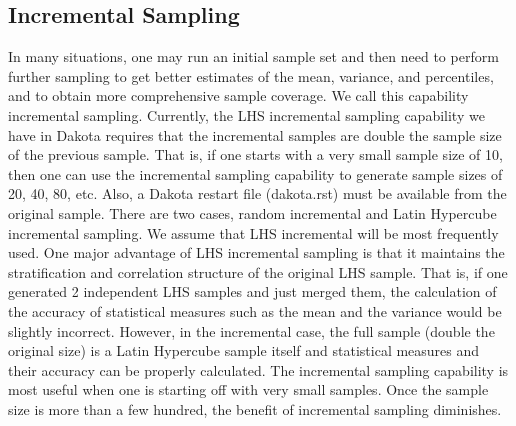 \subsection{Incremental Sampling}\label{uq:incremental}

In many situations, one may run an initial sample set and then need to
perform further sampling to get better estimates of the mean,
variance, and percentiles, and to obtain more comprehensive sample
coverage. We call this capability incremental sampling. Currently,
the LHS incremental sampling capability we have in Dakota requires that
the incremental samples are double the sample size of the previous
sample. That is, if one starts with a very small sample size of 10,
then one can use the incremental sampling capability to generate
sample sizes of 20, 40, 80, etc. Also, a Dakota restart file
(dakota.rst) must be available from the original sample. There are two
cases, random incremental and Latin Hypercube incremental sampling.
We assume that LHS incremental will be most frequently used. One
major advantage of LHS incremental sampling is that it maintains the
stratification and correlation structure of the original LHS sample.
That is, if one generated 2 independent LHS samples and just merged
them, the calculation of the accuracy of statistical measures such as
the mean and the variance would be slightly incorrect. However, in
the incremental case, the full sample (double the original size) is a
Latin Hypercube sample itself and statistical measures and their
accuracy can be properly calculated. The incremental sampling
capability is most useful when one is starting off with very small
samples. Once the sample size is more than a few hundred, the benefit
of incremental sampling diminishes.

